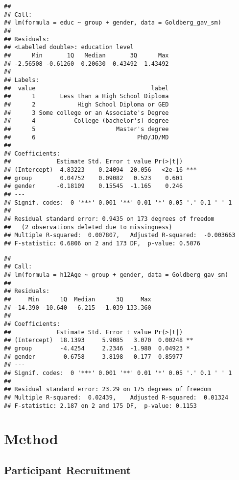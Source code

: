 \documentclass[man]{apa6}
\begin{document}
\begin{verbatim}
## 
## Call:
## lm(formula = educ ~ group + gender, data = Goldberg_gav_sm)
## 
## Residuals:
## <Labelled double>: education level
##      Min       1Q   Median       3Q      Max 
## -2.56508 -0.61260  0.20630  0.43492  1.43492 
## 
## Labels:
##  value                                 label
##      1       Less than a High School Diploma
##      2            High School Diploma or GED
##      3 Some college or an Associate's Degree
##      4           College (bachelor's) degree
##      5                       Master's degree
##      6                             PhD/JD/MD
## 
## Coefficients:
##             Estimate Std. Error t value Pr(>|t|)    
## (Intercept)  4.83223    0.24094  20.056   <2e-16 ***
## group        0.04752    0.09082   0.523    0.601    
## gender      -0.18109    0.15545  -1.165    0.246    
## ---
## Signif. codes:  0 '***' 0.001 '**' 0.01 '*' 0.05 '.' 0.1 ' ' 1
## 
## Residual standard error: 0.9435 on 173 degrees of freedom
##   (2 observations deleted due to missingness)
## Multiple R-squared:  0.007807,   Adjusted R-squared:  -0.003663 
## F-statistic: 0.6806 on 2 and 173 DF,  p-value: 0.5076
\end{verbatim}

\begin{verbatim}
## 
## Call:
## lm(formula = h12Age ~ group + gender, data = Goldberg_gav_sm)
## 
## Residuals:
##     Min      1Q  Median      3Q     Max 
## -14.390 -10.640  -6.215  -1.039 133.360 
## 
## Coefficients:
##             Estimate Std. Error t value Pr(>|t|)   
## (Intercept)  18.1393     5.9085   3.070  0.00248 **
## group        -4.4254     2.2346  -1.980  0.04923 * 
## gender        0.6758     3.8198   0.177  0.85977   
## ---
## Signif. codes:  0 '***' 0.001 '**' 0.01 '*' 0.05 '.' 0.1 ' ' 1
## 
## Residual standard error: 23.29 on 175 degrees of freedom
## Multiple R-squared:  0.02439,    Adjusted R-squared:  0.01324 
## F-statistic: 2.187 on 2 and 175 DF,  p-value: 0.1153
\end{verbatim}

\hypertarget{method}{%
\section{Method}\label{method}}

\hypertarget{participant-recruitment}{%
\subsection{Participant Recruitment}\label{participant-recruitment}}
\end{document}
